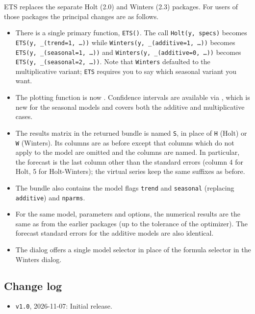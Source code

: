 \documentclass{article}
\begin{document}
ETS replaces the separate \textsf{Holt} (2.0) and \textsf{Winters}
(2.3) packages. For users of those packages the principal changes are
as follows.
\begin{itemize}
\item There is a single primary function, \texttt{ETS()}. The call
  \texttt{Holt(y, specs)} becomes \texttt{ETS(y, \_(trend=1, \dots))}
  while \texttt{Winters(y, \_(additive=1, \dots))} becomes
  \texttt{ETS(y, \_(seasonal=1, \dots))} and
  \texttt{Winters(y, \_(additive=0, \dots))} becomes
  \texttt{ETS(y, \_(seasonal=2, \dots))}. Note that \texttt{Winters}
  defaulted to the multiplicative variant; \texttt{ETS} requires you to
  say which seasonal variant you want.
\item The plotting function is now .  Confidence intervals
  are available via , which is new for the seasonal
  models and covers both the additive and multiplicative cases.
\item The results matrix in the returned bundle is named \texttt{S}, in
  place of \texttt{H} (Holt) or \texttt{W} (Winters). Its columns are as
  before except that columns which do not apply to the model are
  omitted and the columns are named. In particular, the forecast is
  the last column other than the standard errors (column 4 for Holt, 5
  for Holt-Winters); the virtual series keep the same suffixes as before.
\item The bundle also contains the model flags \texttt{trend} and
  \texttt{seasonal} (replacing \texttt{additive}) and \texttt{nparms}.
\item For the same model, parameters and options, the numerical results
  are the same as from the earlier packages (up to the tolerance of the
  optimizer). The forecast standard errors for the additive models are
  also identical.
\item The  dialog offers a single \textsf{model}
  selector in place of the \textsf{formula} selector in the
  \textsf{Winters} dialog.
\end{itemize}

\subsection{Change log}

\begin{itemize}
\item \texttt{v1.0}, 2026-11-07: Initial release.
\end{itemize}



\end{document}
